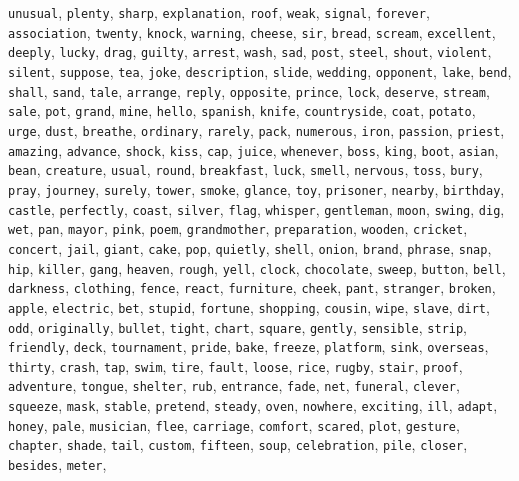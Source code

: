 \verb|unusual|, \verb|plenty|, \verb|sharp|, \verb|explanation|, \verb|roof|, \verb|weak|, \verb|signal|, \verb|forever|, \verb|association|, \verb|twenty|, \verb|knock|, \verb|warning|, \verb|cheese|, \verb|sir|, \verb|bread|, \verb|scream|, \verb|excellent|, \verb|deeply|, \verb|lucky|, \verb|drag|, \verb|guilty|, \verb|arrest|, \verb|wash|, \verb|sad|, \verb|post|, \verb|steel|, \verb|shout|, \verb|violent|, \verb|silent|, \verb|suppose|, \verb|tea|, \verb|joke|, \verb|description|, \verb|slide|, \verb|wedding|, \verb|opponent|, \verb|lake|, \verb|bend|, \verb|shall|, \verb|sand|, \verb|tale|, \verb|arrange|, \verb|reply|, \verb|opposite|, \verb|prince|, \verb|lock|, \verb|deserve|, \verb|stream|, \verb|sale|, \verb|pot|, \verb|grand|, \verb|mine|, \verb|hello|, \verb|spanish|, \verb|knife|, \verb|countryside|, \verb|coat|, \verb|potato|, \verb|urge|, \verb|dust|, \verb|breathe|, \verb|ordinary|, \verb|rarely|, \verb|pack|, \verb|numerous|, \verb|iron|, \verb|passion|, \verb|priest|, \verb|amazing|, \verb|advance|, \verb|shock|, \verb|kiss|, \verb|cap|, \verb|juice|, \verb|whenever|, \verb|boss|, \verb|king|, \verb|boot|, \verb|asian|, \verb|bean|, \verb|creature|, \verb|usual|, \verb|round|, \verb|breakfast|, \verb|luck|, \verb|smell|, \verb|nervous|, \verb|toss|, \verb|bury|, \verb|pray|, \verb|journey|, \verb|surely|, \verb|tower|, \verb|smoke|, \verb|glance|, \verb|toy|, \verb|prisoner|, \verb|nearby|, \verb|birthday|, \verb|castle|, \verb|perfectly|, \verb|coast|, \verb|silver|, \verb|flag|, \verb|whisper|, \verb|gentleman|, \verb|moon|, \verb|swing|, \verb|dig|, \verb|wet|, \verb|pan|, \verb|mayor|, \verb|pink|, \verb|poem|, \verb|grandmother|, \verb|preparation|, \verb|wooden|, \verb|cricket|, \verb|concert|, \verb|jail|, \verb|giant|, \verb|cake|, \verb|pop|, \verb|quietly|, \verb|shell|, \verb|onion|, \verb|brand|, \verb|phrase|, \verb|snap|, \verb|hip|, \verb|killer|, \verb|gang|, \verb|heaven|, \verb|rough|, \verb|yell|, \verb|clock|, \verb|chocolate|, \verb|sweep|, \verb|button|, \verb|bell|, \verb|darkness|, \verb|clothing|, \verb|fence|, \verb|react|, \verb|furniture|, \verb|cheek|, \verb|pant|, \verb|stranger|, \verb|broken|, \verb|apple|, \verb|electric|, \verb|bet|, \verb|stupid|, \verb|fortune|, \verb|shopping|, \verb|cousin|, \verb|wipe|, \verb|slave|, \verb|dirt|, \verb|odd|, \verb|originally|, \verb|bullet|, \verb|tight|, \verb|chart|, \verb|square|, \verb|gently|, \verb|sensible|, \verb|strip|, \verb|friendly|, \verb|deck|, \verb|tournament|, \verb|pride|, \verb|bake|, \verb|freeze|, \verb|platform|, \verb|sink|, \verb|overseas|, \verb|thirty|, \verb|crash|, \verb|tap|, \verb|swim|, \verb|tire|, \verb|fault|, \verb|loose|, \verb|rice|, \verb|rugby|, \verb|stair|, \verb|proof|, \verb|adventure|, \verb|tongue|, \verb|shelter|, \verb|rub|, \verb|entrance|, \verb|fade|, \verb|net|, \verb|funeral|, \verb|clever|, \verb|squeeze|, \verb|mask|, \verb|stable|, \verb|pretend|, \verb|steady|, \verb|oven|, \verb|nowhere|, \verb|exciting|, \verb|ill|, \verb|adapt|, \verb|honey|, \verb|pale|, \verb|musician|, \verb|flee|, \verb|carriage|, \verb|comfort|, \verb|scared|, \verb|plot|, \verb|gesture|, \verb|chapter|, \verb|shade|, \verb|tail|, \verb|custom|, \verb|fifteen|, \verb|soup|, \verb|celebration|, \verb|pile|, \verb|closer|, \verb|besides|, \verb|meter|, 